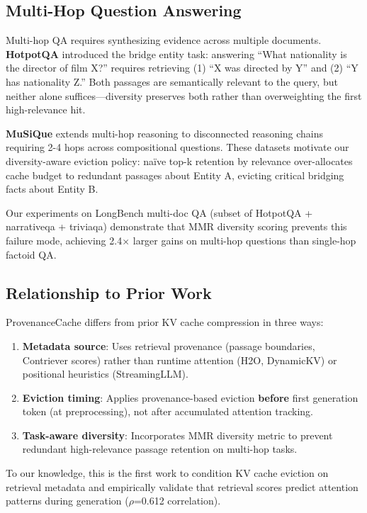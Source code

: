 \subsection{Multi-Hop Question Answering}

Multi-hop QA requires synthesizing evidence across multiple documents. \textbf{HotpotQA} \cite{yang2018hotpotqa} introduced the bridge entity task: answering ``What nationality is the director of film X?'' requires retrieving (1) ``X was directed by Y'' and (2) ``Y has nationality Z.'' Both passages are semantically relevant to the query, but neither alone suffices—diversity preserves both rather than overweighting the first high-relevance hit.

\textbf{MuSiQue} \cite{trivedi2022musique} extends multi-hop reasoning to disconnected reasoning chains requiring 2-4 hops across compositional questions. These datasets motivate our diversity-aware eviction policy: naïve top-k retention by relevance over-allocates cache budget to redundant passages about Entity A, evicting critical bridging facts about Entity B.

Our experiments on LongBench multi-doc QA (subset of HotpotQA + narrativeqa + triviaqa) demonstrate that MMR diversity scoring prevents this failure mode, achieving 2.4$\times$ larger gains on multi-hop questions than single-hop factoid QA.

\subsection{Relationship to Prior Work}

ProvenanceCache differs from prior KV cache compression in three ways:

\begin{enumerate}
\item \textbf{Metadata source}: Uses retrieval provenance (passage boundaries, Contriever scores) rather than runtime attention (H2O, DynamicKV) or positional heuristics (StreamingLLM).

\item \textbf{Eviction timing}: Applies provenance-based eviction \textbf{before} first generation token (at preprocessing), not after accumulated attention tracking.

\item \textbf{Task-aware diversity}: Incorporates MMR diversity metric to prevent redundant high-relevance passage retention on multi-hop tasks.
\end{enumerate}

To our knowledge, this is the first work to condition KV cache eviction on retrieval metadata and empirically validate that retrieval scores predict attention patterns during generation ($\rho$=0.612 correlation).
